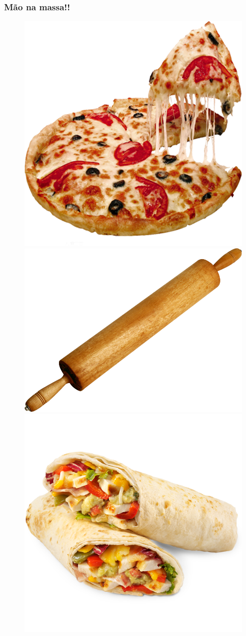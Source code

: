 \documentclass[12pt]{beamer}
\begin{document}
\begin{frame}
    \frametitle{Mão na massa!!}
    \begin{figure}
        \centering
        \includegraphics[width=.3\textwidth]{pizza.png}
        \includegraphics[width=.3\textwidth]{rolo.png}
        \includegraphics[width=.3\textwidth]{burrito.png}
    \end{figure}
\end{frame}
\end{document}
